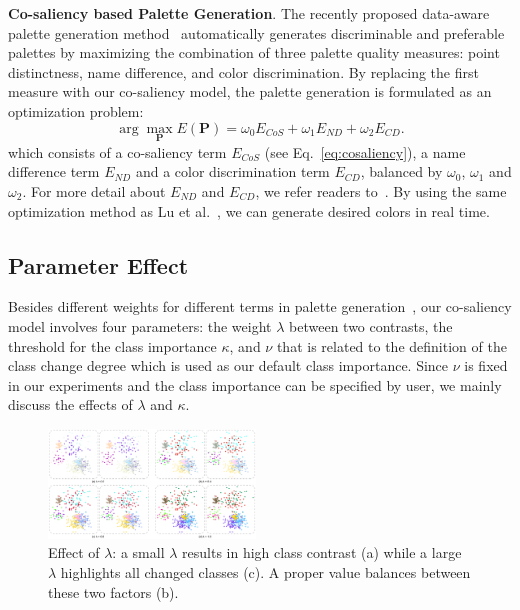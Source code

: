 \vspace{1.5mm}
\noindent\textbf{Co-saliency based Palette Generation}.
The recently proposed data-aware palette generation method~\cite{Lu21} automatically generates discriminable and preferable palettes by maximizing the combination of three palette quality measures: point distinctness, name difference, and color discrimination.
By replacing the first measure with our co-saliency model, the palette generation is formulated as an optimization problem:
\begin{equation}
\arg\max_{\mathbf{P}} E(\mathbf{P}) = \omega_0 E_{CoS} + \omega_1 E_{ND} + \omega_2 E_{CD}.
\label{eq:energyfunc}
\end{equation}
which consists of a co-saliency term $E_{CoS}$ (see Eq.~\ref{eq:cosaliency}), a name difference term $E_{ND}$ and a color discrimination term $E_{CD}$, balanced by $\omega_0$, $\omega_1$ and $\omega_2$. For more detail about $E_{ND}$ and $E_{CD}$, we refer readers to~\cite{Lu21}. By using the same optimization method as Lu et al.~\cite{Lu21}, we can generate desired colors in real time. %



\subsection{Parameter Effect}
\label{subsec:parameter}
Besides different weights for different terms in palette generation~\cite{Lu21}, our co-saliency model involves four parameters: the weight $\lambda$ between two contrasts, the threshold for the class importance $\kappa$, and $\nu$ that is related to the definition of the class change degree which is used as our default class importance.
Since $\nu$ is fixed in our experiments and the class importance can be specified by user, we mainly discuss the effects of $\lambda$  and $\kappa$.

\begin{figure}[!t]
\centering
\includegraphics[width=0.49\textwidth]{figures/lambda.pdf}
\caption{Effect of  $\lambda$: a small $\lambda$ results in high class contrast (a) while a large $\lambda$ highlights all changed classes (c). A proper value balances between these two factors (b).}
\vspace*{-3mm}
\label{fig:lambda}
\end{figure}
\vspace{.5em}

